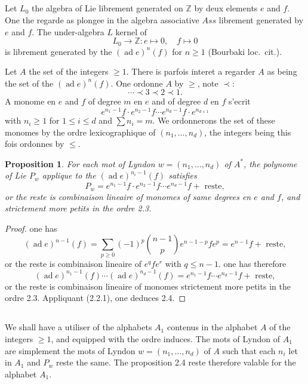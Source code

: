 \documentclass[11pt,a4paper]{article}
\theoremstyle{plain}
\newtheorem{proposition}[theorem]{Proposition}
\theoremstyle{definition}
\DeclareMathOperator{\ad}{ad}
\newcommand{\Ass}{\textit{Ass}}
\newcommand{\Z}{\mathbb{Z}}
\begin{document}
\subsection{}
Let $L_0$ the algebra of Lie librement generated on $\Z$ by deux elements $e$ and $f$. One the regarde as plongee in the algebra associative $\Ass$ librement generated by $e$ and $f$. The under-algebra $L$ kernel of
\begin{equation}\label{eq:2.3.1}
L_0 \to \Z: e \mapsto 0, \quad f \mapsto 0
\end{equation}
is librement generated by the $(\ad e)^n(f)$ for $n \geq 1$ (Bourbaki loc.~cit.).

Let $A$ the set of the integers $\geq 1$. There is parfois interet a regarder $A$ as being the set of the $(\ad e)^n(f)$. One ordonne $A$ by $\geq$, note $\prec$:
\[
\cdots \prec 3 \prec 2 \prec 1.
\]
A monome en $e$ and $f$ of degree $m$ en $e$ and of degree $d$ en $f$ s'ecrit
\[
e^{n_1-1}f \cdot e^{n_2-1}f \cdots e^{n_d-1}f \cdot e^{n_{d+1}}
\]
with $n_i \geq 1$ for $1 \leq i \leq d$ and $\sum n_i = m$. We ordonnerons the set of these monomes by the ordre lexicographique of $(n_1,\ldots,n_d)$, the integers being this fois ordonnes by $\leq$.

\begin{proposition}\label{prop:2.4}
For each mot of Lyndon $w = (n_1,\ldots,n_d)$ of $A^{\ast}$, the polynome of Lie $P_w$ applique to the $(\ad e)^{n_i-1}(f)$ satisfies
\[
P_w = e^{n_1-1}f \cdot e^{n_2-1}f \cdots e^{n_d-1}f + \text{ reste},
\]
or the reste is combinaison lineaire of monomes of same degrees en $e$ and $f$, and strictement more petits in the ordre 2.3.
\end{proposition}

\begin{proof}
one has
\[
(\ad e)^{n-1}(f) = \sum_{p \geq 0} (-1)^p \binom{n-1}{p} e^{n-1-p}fe^p = e^{n-1}f + \text{ reste},
\]
or the reste is combinaison lineaire of $e^qfe^r$ with $q \leq n-1$. one has therefore
\[
(\ad e)^{n_1-1}(f) \cdots (\ad e)^{n_d-1}(f) = e^{n_1-1}f \cdots e^{n_d-1}f + \text{ reste},
\]
or the reste is combinaison lineaire of monomes strictement more petits in the ordre 2.3. Appliquant (2.2.1), one deduces 2.4.
\end{proof}

\subsection{}
We shall have a utiliser of the alphabets $A_1$ contenus in the alphabet $A$ of the integers $\geq 1$, and equipped with the ordre induces. The mots of Lyndon of $A_1$ are simplement the mots of Lyndon $w = (n_1,\ldots,n_d)$ of $A$ such that each $n_i$ let in $A_1$ and $P_w$ reste the same. The proposition 2.4 reste therefore valable for the alphabet $A_1$.
\end{document}
